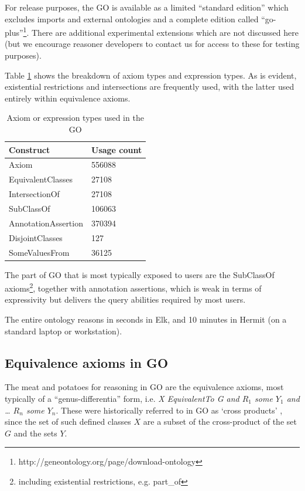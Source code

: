 \documentclass{llncs}
\begin{document}
For release purposes, the GO is available as a limited ``standard
edition'' which excludes imports and external ontologies and a
complete edition called
``go-plus''\footnote{http://geneontology.org/page/download-ontology}. There
are additional experimental extensions which are not discussed here
(but we encourage reasoner developers to contact us for access to
these for testing purposes).

Table \ref{tab:constructs} shows the breakdown of axiom types and
expression types. As is evident, existential restrictions and
intersections are frequently used, with the latter used entirely
within equivalence axioms.

\begin{table}
\begin{tabular}{ | p{4cm} | p{3cm} |  }
\hline
\textbf{Construct} & \textbf{Usage count}  \\
\hline
Axiom & 556088 \\
EquivalentClasses & 27108 \\
IntersectionOf & 27108 \\
SubClassOf & 106063  \\
AnnotationAssertion & 370394 \\
DisjointClasses & 127 \\
SomeValuesFrom & 36125 \\
\hline
\end{tabular}
\caption{Axiom or expression types used in the GO }
\label{tab:constructs}
\end{table}

The part of GO that is most typically exposed to users are the
SubClassOf axioms\footnote{including existential restrictions, e.g. part\_of},
together with annotation assertions, which is weak in terms of
expressivity but delivers the query abilities required by most users.

The entire ontology reasons in seconds in Elk\cite{kazakov2012elk}, and 10
minutes in Hermit (on a standard laptop or workstation).

\subsection{Equivalence axioms in GO}

The meat and potatoes for reasoning in GO are the equivalence axioms,
most typically of a ``genus-differentia'' form, i.e. \emph{X
  EquivalentTo G and $R_1$ some $Y_1$ and … $R_n$ some $Y_n$}. These were
historically referred to in GO as `cross
products' \cite{Mungall2010GOXP}, since the set of such defined classes
$X$ are a subset of the cross-product of the set $G$ and the sets
$Y$.
\end{document}

